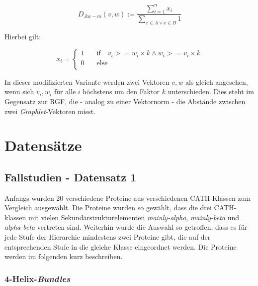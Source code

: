 \documentclass{report}
\begin{document}
\[ D_{Jac-m}(v,w) := \frac{\sum_{i = 1}^n x_i}{\sum_{x \in A \lor x \in B} 1} \]

Hierbei gilt:

\[ x_i = 
   \begin{cases}
     1     & \quad \mathrm{if} \quad v_i >= w_i \times k \land w_i >= v_i \times k \\
     0     & \quad \mathrm{else} \\
   \end{cases}
\]

In dieser modifizierten Variante werden zwei Vektoren $v,w$ als gleich angesehen, wenn sich $v_i,w_i$ f\"ur alle $i$ h\"ochstens um den Faktor $k$ unterschieden.
Dies steht im Gegensatz zur RGF, die - analog zu einer Vektornorm - die Abst\"ande zwischen zwei \textit{Graphlet}-Vektoren misst.



\section{Datens\"atze}


\subsection{Fallstudien - Datensatz 1}

Anfangs wurden 20 verschiedene Proteine aus verschiedenen CATH-Klassen zum Vergleich ausgew\"ahlt. Die Proteine wurden so gew\"ahlt, dass die drei CATH-klassen mit vielen Sekund\"arstrukturelementen \textit{mainly-alpha}, \textit{mainly-beta} und \textit{alpha-beta} vertreten sind. Weiterhin wurde die Auswahl so getroffen, dass es f\"ur jede Stufe der Hierarchie mindestens zwei Proteine gibt, die auf der entsprechenden Stufe in die gleiche Klasse eingeordnet werden. Die Proteine werden im folgenden kurz beschreiben.


\subsubsection{4-Helix-\textit{Bundles}}
\end{document}
